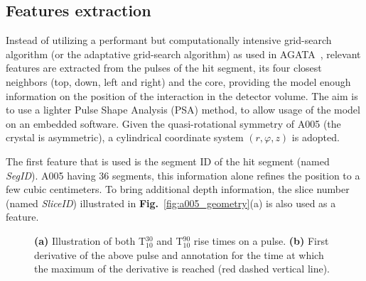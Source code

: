 \subsection{Features extraction}
\label{subsec:feature_extraction}

Instead of utilizing a performant but computationally intensive grid-search algorithm (or the adaptative grid-search algorithm) as used in AGATA~\cite{Venturelli2004}, relevant features are extracted from the pulses of the hit segment, its four closest neighbors (top, down, left and right) and the core, providing the model enough information on the position of the interaction in the detector volume. The aim is to use a lighter Pulse Shape Analysis (PSA) method, to allow usage of the model on an embedded software. Given the quasi-rotational symmetry of A005 (the crystal is asymmetric), a cylindrical coordinate system $(r, \varphi, z)$ is adopted.

The first feature that is used is the segment ID of the hit segment (named \textit{SegID}). A005 having 36 segments, this information alone refines the position to a few cubic centimeters. To bring additional depth information, the slice number (named \textit{SliceID}) illustrated in \textbf{Fig.}~\ref{fig:a005_geometry}(a) is also used as a feature.

\begin{figure}
\centering
{}
\caption{\textbf{(a)} Illustration of both T$^{30}_{10}$ and T$^{90}_{10}$ rise times on a pulse. \textbf{(b)} First derivative of the above pulse and annotation for the time at which the maximum of the derivative is reached (red dashed vertical line).}
\label{fig:pulse_t30_t90}
\end{figure}

